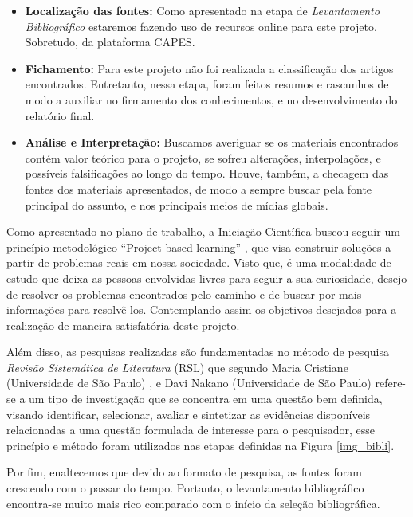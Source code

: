 \begin{itemize}
\item \textbf{Localização das fontes:} Como apresentado na etapa de  \textit{Levantamento Bibliográfico} estaremos fazendo uso de recursos online para este projeto. Sobretudo, da plataforma CAPES.

\item \textbf{Fichamento:} Para este projeto não foi realizada a classificação dos artigos encontrados. Entretanto, nessa etapa, foram feitos resumos e rascunhos de modo a auxiliar no firmamento dos conhecimentos, e no desenvolvimento do relatório final.

\item \textbf{Análise e Interpretação:} Buscamos averiguar se os materiais encontrados contém valor teórico para o projeto, se sofreu alterações, interpolações, e possíveis falsificações ao longo do tempo. Houve, também, a checagem das fontes dos materiais apresentados, de modo a sempre buscar pela fonte principal do assunto, e nos principais meios de mídias globais.


\end{itemize}

 
Como apresentado no plano de trabalho, a Iniciação Científica buscou seguir um princípio metodológico “Project-based learning” \cite{krajcik2006project}, que visa construir soluções a partir de problemas reais em nossa sociedade. Visto que, é uma modalidade de estudo que deixa as pessoas envolvidas livres para seguir a sua curiosidade, desejo de resolver os problemas encontrados pelo caminho e de buscar por mais informações para resolvê-los. Contemplando assim os objetivos desejados para a realização de maneira satisfatória deste projeto. 

Além disso, as pesquisas realizadas são fundamentadas no método de pesquisa \textit{Revisão Sistemática de Literatura} (RSL) que segundo Maria Cristiane (Universidade de São Paulo) \cite{revi3}, e Davi Nakano (Universidade de São Paulo) \cite{revi2} refere-se a um tipo de investigação que se concentra em uma questão bem definida, visando identificar, selecionar, avaliar e sintetizar as evidências disponíveis relacionadas a uma questão formulada de interesse para o pesquisador, esse princípio e método foram utilizados nas etapas definidas na Figura \ref{img_bibli}.

Por fim, enaltecemos que devido ao formato de pesquisa, as fontes foram crescendo com o passar do tempo. Portanto, o levantamento bibliográfico encontra-se muito mais rico comparado com o início da seleção bibliográfica.



